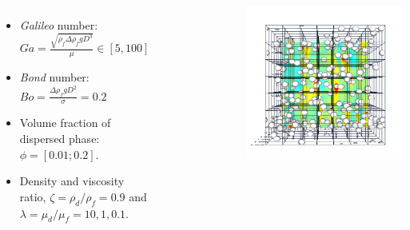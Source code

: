 \documentclass{sintefbeamer}
\begin{document}
\begin{frame}
\begin{columns}
{  \begin{itemize}
    \item \textit{Galileo} number: $Ga =\frac{\sqrt{\rho_f \Delta\rho_f gD^3}}{\mu} \in [5, 100]$
    \item \textit{Bond} number: $Bo = \frac{\Delta \rho_f g D^2}{\sigma} = 0.2$ 
    \item Volume fraction of dispersed phase: $\phi = [0.01;0.2]$. 
    \item Density and viscosity ratio, $\zeta=\rho_d/\rho_f=0.9$ and $\lambda=\mu_d/\mu_f= 10,1,0.1$. 
  \end{itemize}
  }
  \begin{figure}
  \end{figure}
  \centering
  \href{videos/DNS.mp4}{}
  \includegraphics[width =  1.1\textwidth]{image/PHI_01_Ga_75.png}
  \end{columns}
\end{frame}



\end{document}
